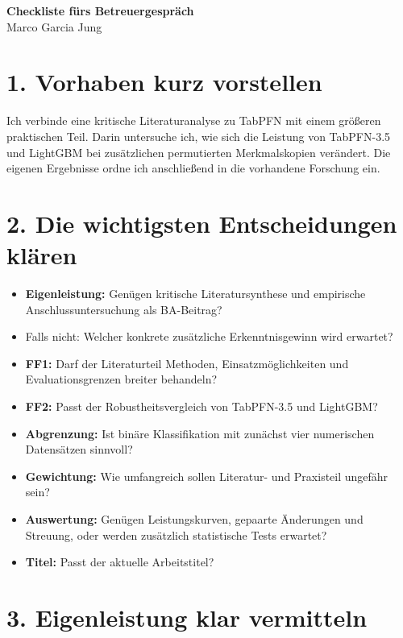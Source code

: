 \documentclass[11pt,a4paper]{article}
\begin{document}
\begin{center}
{\Large\bfseries Checkliste fürs Betreuergespräch}\\[0.4em]
Marco Garcia Jung
\end{center}

\section*{1. Vorhaben kurz vorstellen}

Ich verbinde eine kritische Literaturanalyse zu TabPFN mit einem größeren
praktischen Teil. Darin untersuche ich, wie sich die Leistung von
TabPFN-3.5 und LightGBM bei zusätzlichen permutierten Merkmalskopien
verändert. Die eigenen Ergebnisse ordne ich anschließend in die
vorhandene Forschung ein.

\section*{2. Die wichtigsten Entscheidungen klären}

\begin{itemize}
  \item \textbf{Eigenleistung:} Genügen kritische Literatursynthese und
        empirische Anschlussuntersuchung als BA-Beitrag?
  \item Falls nicht: Welcher konkrete zusätzliche Erkenntnisgewinn
        wird erwartet?
  \item \textbf{FF1:} Darf der Literaturteil Methoden, Einsatzmöglichkeiten
        und Evaluationsgrenzen breiter behandeln?
  \item \textbf{FF2:} Passt der Robustheitsvergleich von TabPFN-3.5
        und LightGBM?
  \item \textbf{Abgrenzung:} Ist binäre Klassifikation mit zunächst
        vier numerischen Datensätzen sinnvoll?
  \item \textbf{Gewichtung:} Wie umfangreich sollen Literatur-
        und Praxisteil ungefähr sein?
  \item \textbf{Auswertung:} Genügen Leistungskurven, gepaarte Änderungen
        und Streuung, oder werden zusätzlich statistische Tests erwartet?
  \item \textbf{Titel:} Passt der aktuelle Arbeitstitel?
\end{itemize}

\section*{3. Eigenleistung klar vermitteln}
\end{document}
